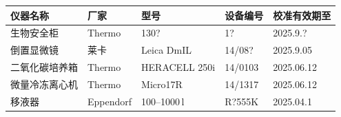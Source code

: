 \documentclass[UTF8,10pt,a4paper,fontset=fandol]{ctexart}
\newcommand{\fieldvalue}[1]{#1}
\newcommand{\handwritten}[1]{#1}
\begin{document}
\begin{tabularx}{\textwidth}{|X|X|X|X|X|}
\hline
仪器名称 & 厂家 & 型号 & 设备编号 & 校准有效期至
\\ \hline
生物安全柜 &
\fieldvalue{Thermo} &
\fieldvalue{\handwritten{130?}} &
\fieldvalue{\handwritten{1?}} &
\fieldvalue{\handwritten{2025.9.?}}
\\ \hline
倒置显微镜 &
\fieldvalue{莱卡} &
\fieldvalue{Leica DmIL} &
\fieldvalue{\handwritten{14/08?}} &
\fieldvalue{\handwritten{2025.9.05}}
\\ \hline
二氧化碳培养箱 &
\fieldvalue{Thermo} &
\fieldvalue{HERACELL 250i} &
\fieldvalue{\handwritten{14/0103}} &
\fieldvalue{\handwritten{2025.06.12}}
\\ \hline
微量冷冻离心机 &
\fieldvalue{Thermo} &
\fieldvalue{Micro17R} &
\fieldvalue{\handwritten{14/1317}} &
\fieldvalue{\handwritten{2025.06.12}}
\\ \hline
移液器 &
\fieldvalue{Eppendorf} &
\fieldvalue{\handwritten{100--1000\,\textmu l}} &
\fieldvalue{\handwritten{R?555K}} &
\fieldvalue{\handwritten{2025.04.1}}
\\ \hline
\end{tabularx}
\end{document}
